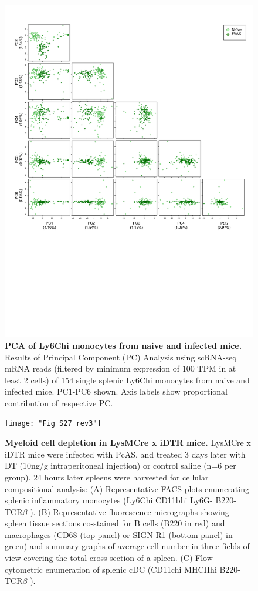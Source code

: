 \begin{figure}
    \centering
    \includegraphics[width=\textwidth]{"Fig S24 rev3"}
    \caption[PCA of Ly6Chi monocytes from naive and infected mice]{\textbf{PCA of Ly6Chi monocytes from naive and infected mice.} Results of Principal Component (PC) Analysis using scRNA-seq mRNA reads (filtered by minimum expression of 100 TPM in at least 2 cells) of 154 single splenic Ly6Chi monocytes from naive and infected mice. PC1-PC6 shown. Axis labels show proportional contribution of respective PC.}
    \label{fig:ms24}
\end{figure}

\begin{figure}
    \centering
    \texttt{[image: "Fig S27 rev3"]}
    \caption[Myeloid cell depletion in LysMCre x iDTR mice]{\textbf{Myeloid cell depletion in LysMCre x iDTR mice.} LysMCre x iDTR mice were infected with PcAS, and treated 3 days later with DT (10ng/g intraperitoneal injection) or control saline (n=6 per group). 24 hours later spleens were harvested for cellular compositional analysis: (A) Representative FACS plots enumerating splenic inflammatory monocytes (Ly6Chi CD11bhi Ly6G- B220- TCR\( \beta \)-). (B) Representative fluorescence micrographs showing spleen tissue sections co-stained for B cells (B220 in red) and macrophages (CD68 (top panel) or SIGN-R1 (bottom panel) in green) and summary graphs of average cell number in three fields of view covering the total cross section of a spleen. (C) Flow cytometric enumeration of splenic cDC (CD11chi MHCIIhi B220- TCR\( \beta \)-).}
    \label{fig:ms27}
\end{figure}

